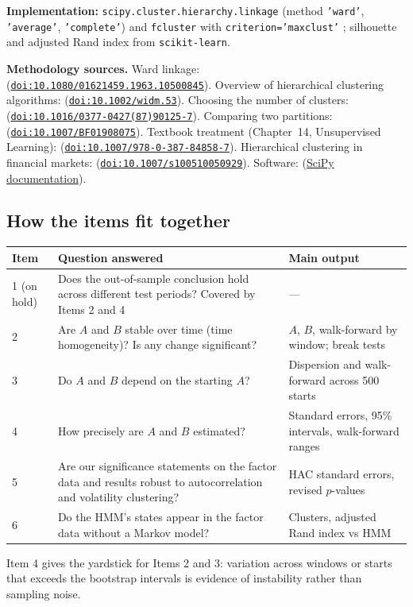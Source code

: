 \documentclass[11pt]{article}
\newcommand{\doi}[1]{\href{https://doi.org/#1}{\nolinkurl{doi:#1}}}
\begin{document}
\textbf{Implementation:} \texttt{scipy.cluster.hierarchy.linkage} (method \texttt{'ward'}, \texttt{'average'}, \texttt{'complete'}) and \texttt{fcluster} with \texttt{criterion='maxclust'} \citep{scipy_hierarchy}; silhouette and adjusted Rand index from \texttt{scikit-learn}.

\textbf{Methodology sources.} Ward linkage: \citet{ward1963} (\doi{10.1080/01621459.1963.10500845}). Overview of hierarchical clustering algorithms: \citet{murtagh2012} (\doi{10.1002/widm.53}). Choosing the number of clusters: \citet{rousseeuw1987} (\doi{10.1016/0377-0427(87)90125-7}). Comparing two partitions: \citet{hubert1985} (\doi{10.1007/BF01908075}). Textbook treatment (Chapter~14, Unsupervised Learning): \citet{hastie2009} (\doi{10.1007/978-0-387-84858-7}). Hierarchical clustering in financial markets: \citet{mantegna1999} (\doi{10.1007/s100510050929}). Software: \citet{scipy_hierarchy} (\href{https://docs.scipy.org/doc/scipy/reference/generated/scipy.cluster.hierarchy.linkage.html}{SciPy documentation}).

\subsection{How the items fit together}
\begin{center}
\begin{tabularx}{\textwidth}{@{}lXl@{}}
\toprule
Item & Question answered & Main output \\
\midrule
1 (on hold) & Does the out-of-sample conclusion hold across different test periods? Covered by Items 2 and 4 & --- \\
2 & Are $A$ and $B$ stable over time (time homogeneity)? Is any change significant? & $A$, $B$, walk-forward by window; break tests \\
3 & Do $A$ and $B$ depend on the starting $A$? & Dispersion and walk-forward across 500 starts \\
4 & How precisely are $A$ and $B$ estimated? & Standard errors, 95\% intervals, walk-forward ranges \\
5 & Are our significance statements on the factor data and results robust to autocorrelation and volatility clustering? & HAC standard errors, revised $p$-values \\
6 & Do the HMM's states appear in the factor data without a Markov model? & Clusters, adjusted Rand index vs HMM \\
\bottomrule
\end{tabularx}
\end{center}
Item 4 gives the yardstick for Items 2 and 3: variation across windows or starts that exceeds the bootstrap intervals is evidence of instability rather than sampling noise.
\end{document}
